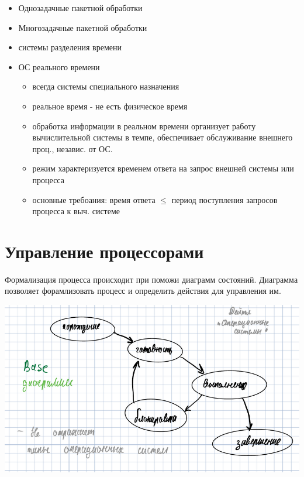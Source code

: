 \documentclass[14pt, a4paper]{article}
\begin{document}
	\begin{itemize}
		\item Однозадачные пакетной обработки
		
		\item Многозадачные пакетной обработки
		
		\item системы разделения времени
		
		\item ОС реального времени
		
		\begin{itemize}
			\item всегда системы специального назначения
			
			\item реальное время - не есть физическое время
			
			\item обработка информации в реальном времени организует работу вычислительной системы в темпе, обеспечивает обслуживание внешнего проц., независ. от ОС.
			
			\item режим характеризуется временем ответа на запрос внешней системы или процесса
			
			\item основные требоания: время ответа $\le$ период поступления запросов процесса к выч. системе
		\end{itemize}
	\end{itemize}

	\section*{Управление процессорами}
	
	Формализация процесса происходит при поможи диаграмм состояний. Диаграмма позволяет форамлизовать процесс и определить действия для управления им.
	
	\includegraphics[width=\linewidth]{2}
\end{document}

